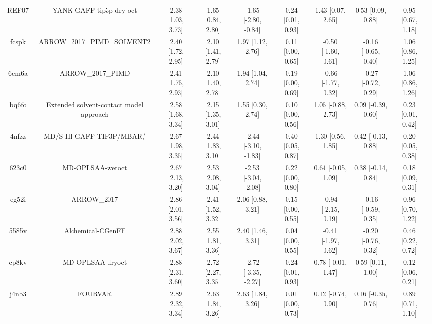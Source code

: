 \documentclass{article}
\begin{document}
\begin{center}
\begin{longtable}{|ccccccccc|}
 REF07 &                            YANK-GAFF-tip3p-dry-oct &  2.38 [1.03, 3.73] &  1.65 [0.84, 2.80] &  -1.65 [-2.80, -0.84] &  0.24 [0.01, 0.93] &    1.43 [0.07, 2.65] &    0.53 [0.09, 0.88] &     0.95 [0.67, 1.18] \\
 fcspk &                        ARROW\_2017\_PIMD\_SOLVENT2 &  2.40 [1.72, 2.95] &  2.10 [1.41, 2.79] &     1.97 [1.12, 2.76] &  0.11 [0.00, 0.65] &  -0.50 [-1.60, 0.61] &  -0.16 [-0.65, 0.40] &     1.06 [0.86, 1.25] \\
 6cm6a &                                  ARROW\_2017\_PIMD &  2.41 [1.75, 2.93] &  2.10 [1.40, 2.78] &     1.94 [1.04, 2.74] &  0.19 [0.00, 0.69] &  -0.66 [-1.77, 0.32] &  -0.27 [-0.72, 0.29] &     1.06 [0.86, 1.26] \\
 bq6fo &            Extended solvent-contact model approach &  2.58 [1.68, 3.34] &  2.15 [1.35, 3.01] &     1.55 [0.30, 2.74] &  0.10 [0.00, 0.56] &   1.05 [-0.88, 2.73] &   0.09 [-0.39, 0.60] &     0.23 [0.01, 0.42] \\
 4nfzz &                           MD/S-HI-GAFF-TIP3P/MBAR/ &  2.67 [1.98, 3.35] &  2.44 [1.83, 3.10] &  -2.44 [-3.10, -1.83] &  0.40 [0.05, 0.87] &    1.30 [0.56, 1.85] &   0.42 [-0.13, 0.88] &     0.20 [0.05, 0.38] \\
 623c0 &                                   MD-OPLSAA-wetoct &  2.67 [2.13, 3.20] &  2.53 [2.08, 3.04] &  -2.53 [-3.04, -2.08] &  0.22 [0.00, 0.80] &   0.64 [-0.05, 1.09] &   0.38 [-0.14, 0.84] &     0.18 [0.09, 0.31] \\
 eg52i &                                        ARROW\_2017 &  2.86 [2.01, 3.56] &  2.41 [1.52, 3.32] &     2.06 [0.88, 3.21] &  0.15 [0.00, 0.55] &  -0.94 [-2.15, 0.19] &  -0.16 [-0.59, 0.35] &     0.96 [0.70, 1.22] \\
 5585v &                                  Alchemical-CGenFF &  2.88 [2.02, 3.67] &  2.55 [1.81, 3.36] &     2.40 [1.46, 3.31] &  0.04 [0.00, 0.55] &  -0.41 [-1.97, 0.62] &  -0.20 [-0.76, 0.32] &     0.46 [0.22, 0.72] \\
 cp8kv &                                   MD-OPLSAA-dryoct &  2.88 [2.31, 3.60] &  2.72 [2.27, 3.35] &  -2.72 [-3.35, -2.27] &  0.24 [0.01, 0.93] &   0.78 [-0.01, 1.47] &    0.59 [0.11, 1.00] &     0.12 [0.06, 0.21] \\
 j4nb3 &                                            FOURVAR &  2.89 [2.32, 3.34] &  2.63 [1.84, 3.26] &     2.63 [1.84, 3.26] &  0.01 [0.00, 0.73] &   0.12 [-0.74, 0.90] &   0.16 [-0.35, 0.76] &     0.89 [0.71, 1.10] \\

\end{longtable}
\end{center}
\end{document}
